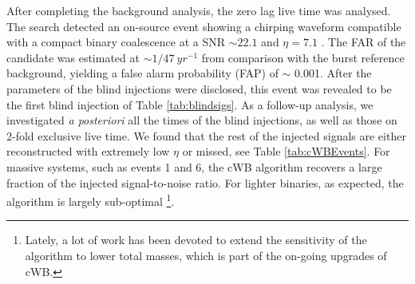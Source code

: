 \documentclass[12pt]{iopart}
\begin{document}
After completing the background analysis, the zero lag live 
time was analysed. The search detected an on-source event showing a chirping 
waveform compatible with a compact binary coalescence at a SNR 
$\sim 22.1$ and $\eta = 7.1$ . The FAR of the candidate was 
estimated at $\sim 1/47~yr^{-1}$ from
comparison with the burst reference background, yielding a false alarm 
probability (FAP) of $\sim$ 0.001. After the parameters of the blind injections
were disclosed, this event was revealed to be the first blind injection of 
Table 
\ref{tab:blindsigs}.
As a follow-up analysis, we investigated \textit{a posteriori} all the times of 
the blind injections, as well as those on 2-fold exclusive live time. We found 
that the rest of the injected signals are either reconstructed with extremely 
low $\eta$ or missed, see Table \ref{tab:cWBEvents}. For massive systems, such 
as events 1 and 6, the cWB algorithm recovers a large fraction of the 
injected signal-to-noise ratio. For lighter binaries, as expected, the 
algorithm is largely sub-optimal
\footnote{Lately, a lot of work has been 
devoted to extend the sensitivity of the algorithm to lower total masses, which 
is part of the on-going upgrades of cWB.}.     
\end{document}
